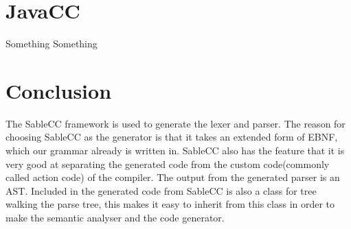\section{JavaCC}
Something Something


\section{Conclusion}
The SableCC framework is used to generate the lexer and parser. The reason for choosing SableCC as the generator is that it takes an extended form of EBNF, which our grammar already is written in. SableCC also has the feature that it is very good at separating the generated code from the custom code(commonly called action code) of the compiler. The output from the generated parser is an AST. Included in the generated code from SableCC is also a class for tree walking the parse tree, this makes it easy to inherit  from this class in order to make the semantic analyser and the code generator.